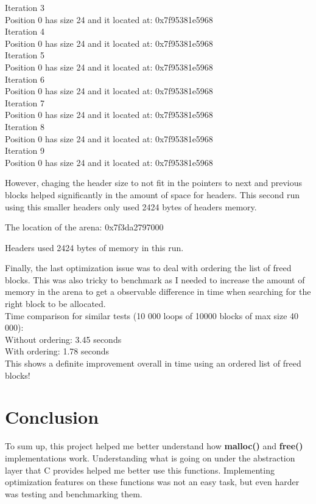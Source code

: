 \documentclass[a4paper,10pt]{article}
\begin{document}
Iteration 3\\
Position 0 has size 24 and it located at: 0x7f95381e5968\\
Iteration 4\\
Position 0 has size 24 and it located at: 0x7f95381e5968\\
Iteration 5\\
Position 0 has size 24 and it located at: 0x7f95381e5968\\
Iteration 6\\
Position 0 has size 24 and it located at: 0x7f95381e5968\\
Iteration 7\\
Position 0 has size 24 and it located at: 0x7f95381e5968\\
Iteration 8\\
Position 0 has size 24 and it located at: 0x7f95381e5968\\
Iteration 9\\
Position 0 has size 24 and it located at: 0x7f95381e5968\\

\vspace{5mm}

However, chaging the header size to not fit in the pointers to next and previous blocks helped significantly in the amount of space for headers. This second run using this smaller headers only used 2424 bytes of headers memory.
\vspace{5mm}

The location of the arena: 0x7f3da2797000

Headers used 2424 bytes of memory in this run.
\vspace{5mm}

Finally, the last optimization issue was to deal with ordering the list of freed blocks. This was also tricky to benchmark as I needed to increase the amount of memory in the arena to get a observable difference in time when searching for the right block to be allocated.\\
Time comparison for similar tests (10 000 loops of 10000 blocks of max size 40 000):\\
Without ordering: 3.45 seconds\\
With ordering: 1.78 seconds\\
This shows a definite improvement overall in time using an ordered list of freed blocks!
\section*{Conclusion}
To sum up, this project helped me better understand how \textbf{malloc()} and \textbf{free()} implementations work. Understanding what is going on under the abstraction layer that C provides helped me better use this functions. Implementing optimization features on these functions was not an easy task, but even harder was testing and benchmarking them.
\end{document}

